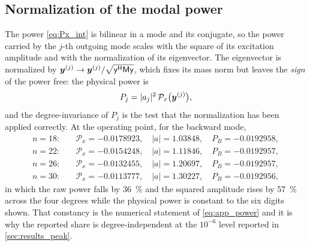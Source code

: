 \subsection{Normalization of the modal power}

The power \eqref{eq:Px_int} is bilinear in a mode and its conjugate, so the power
carried by the $j$-th outgoing mode scales with the square of its excitation
amplitude and with the normalization of its eigenvector.  The eigenvector is
normalized by $\boldsymbol{y}^{(j)}\to\boldsymbol{y}^{(j)}/\sqrt{\mathsf y^{\mathsf H}\mathsf
M\mathsf y}$, which fixes its mass norm but leaves the \emph{sign} of the power free:
the physical power is
\begin{equation}
\label{eq:app_power}
P_j=|a_j|^{2}\,\mathcal{P}_x\bigl(\boldsymbol{y}^{(j)}\bigr),
\end{equation}
and the degree-invariance of $P_j$ is the test that the normalization has been
applied correctly.  At the operating point, for the backward mode,
\begin{equation}
\label{eq:app_power_numbers}
\begin{aligned}
n=18:&\quad \mathcal{P}_x=-0.0178923,\quad |a|=1.03848,\quad P_B=-0.0192958,\\
n=22:&\quad \mathcal{P}_x=-0.0154248,\quad |a|=1.11846,\quad P_B=-0.0192957,\\
n=26:&\quad \mathcal{P}_x=-0.0132455,\quad |a|=1.20697,\quad P_B=-0.0192957,\\
n=30:&\quad \mathcal{P}_x=-0.0113777,\quad |a|=1.30227,\quad P_B=-0.0192956,
\end{aligned}
\end{equation}
in which the raw power falls by \SI{36}{\percent} and the squared amplitude rises by
\SI{57}{\percent} across the four degrees while the physical power is constant to
the six digits shown.  That constancy is the
numerical statement of \eqref{eq:app_power} and it is why the reported
share is degree-independent at the $10^{-6}$ level reported in
\cref{sec:results_peak}.
